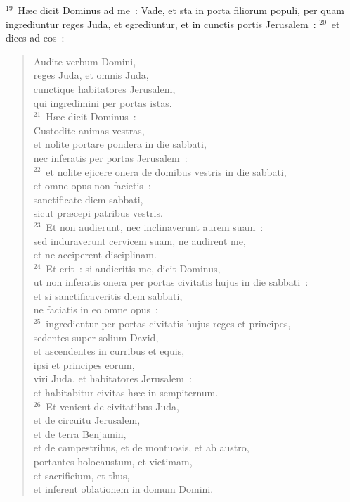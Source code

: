 ${}^{19}$~H\ae c dicit Dominus ad me~: Vade, et sta in porta filiorum populi, per quam ingrediuntur reges Juda, et egrediuntur, et in cunctis portis Jerusalem~:
${}^{20}$~et dices ad eos~: \begin{flushleft}\begin{verse}Audite verbum Domini,\\ reges Juda, et omnis Juda,\\ cunctique habitatores Jerusalem,\\ qui ingredimini per portas istas.\\
${}^{21}$~H\ae c dicit Dominus~:\\ Custodite animas vestras,\\ et nolite portare pondera in die sabbati,\\ nec inferatis per portas Jerusalem~:\\
${}^{22}$~et nolite ejicere onera de domibus vestris in die sabbati,\\ et omne opus non facietis~:\\ sanctificate diem sabbati,\\ sicut pr\ae cepi patribus vestris.\\
${}^{23}$~Et non audierunt, nec inclinaverunt aurem suam~:\\ sed induraverunt cervicem suam, ne audirent me,\\ et ne acciperent disciplinam.\\
${}^{24}$~Et erit~: si audieritis me, dicit Dominus,\\ ut non inferatis onera per portas civitatis hujus in die sabbati~:\\ et si sanctificaveritis diem sabbati,\\ ne faciatis in eo omne opus~:\\
${}^{25}$~ingredientur per portas civitatis hujus reges et principes,\\ sedentes super solium David,\\ et ascendentes in curribus et equis,\\ ipsi et principes eorum,\\ viri Juda, et habitatores Jerusalem~:\\ et habitabitur civitas h\ae c in sempiternum.\\
${}^{26}$~Et venient de civitatibus Juda,\\ et de circuitu Jerusalem,\\ et de terra Benjamin,\\ et de campestribus, et de montuosis, et ab austro,\\ portantes holocaustum, et victimam,\\ et sacrificium, et thus,\\ et inferent oblationem in domum Domini.\\

\end{verse}
\end{flushleft}
